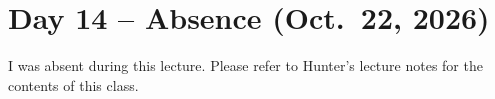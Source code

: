\section{Day 14 -- Absence (Oct.\ 22, 2026)}
I was absent during this lecture. Please refer to Hunter's lecture notes for the contents of this class.